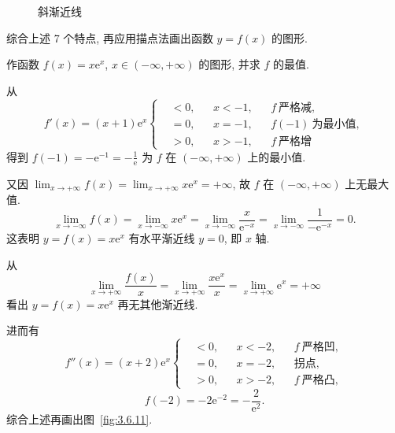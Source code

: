 \begin{figure}[htbp]
\centering
{}
\caption{斜渐近线}\label{fig:3.6.10}
\end{figure}

综合上述 7 个特点, 再应用描点法画出函数 $y=f(x)$ 的图形.

\begin{example}\label{ex:3.6.7}
作函数 $f(x)=x\mathrm{e}^{x}$, $x\in(-\infty,+\infty)$ 的图形, 并求 $f$ 的最值.
\end{example}

\begin{solution}
从
\[
f'(x)=(x+1)\mathrm{e}^{x}\left\{
\begin{aligned}
&<0, &&x<-1, &&f\ \text{严格减},\\
&=0, &&x=-1, &&f(-1)\ \text{为最小值},\\
&>0, &&x>-1, &&f\ \text{严格增}
\end{aligned}\right.
\]
得到 $f(-1)=-\mathrm{e}^{-1}=-\frac{1}{\mathrm{e}}$ 为 $f$ 在 $(-\infty,+\infty)$ 上的最小值.

又因 $\lim_{x\to+\infty}f(x)=\lim_{x\to+\infty}x\mathrm{e}^{x}=+\infty$, 故 $f$ 在 $(-\infty,+\infty)$ 上无最大值.
\[
\lim_{x\to-\infty}f(x)=\lim_{x\to-\infty}x\mathrm{e}^{x}=\lim_{x\to-\infty}\frac{x}{\mathrm{e}^{-x}}=\lim_{x\to-\infty}\frac{1}{-\mathrm{e}^{-x}}=0.
\]
这表明 $y=f(x)=x\mathrm{e}^{x}$ 有水平渐近线 $y=0$, 即 $x$ 轴.

从
\[
\lim_{x\to+\infty}\frac{f(x)}{x}=\lim_{x\to+\infty}\frac{x\mathrm{e}^{x}}{x}=\lim_{x\to+\infty}\mathrm{e}^{x}=+\infty
\]
看出 $y=f(x)=x\mathrm{e}^{x}$ 再无其他渐近线.

进而有
\[
f''(x)=(x+2)\mathrm{e}^{x}\left\{
\begin{aligned}
&<0, &&x<-2, &&f\ \text{严格凹},\\
&=0, &&x=-2, &&\text{拐点},\\
&>0, &&x>-2, &&f\ \text{严格凸},
\end{aligned}\right.
\]
\[
f(-2)=-2\mathrm{e}^{-2}=-\frac{2}{\mathrm{e}^{2}}.
\]
综合上述再画出图~\ref{fig:3.6.11}.
\end{solution}

